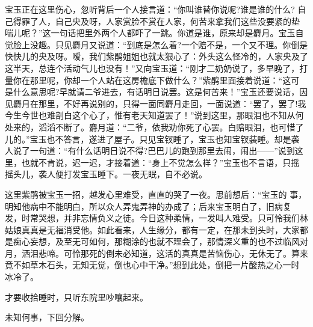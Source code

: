 宝玉正在这里伤心，忽听背后一个人接言道：“你叫谁替你说呢?谁是谁的什么?
自己得罪了人，自己央及呀，人家赏脸不赏在人家，何苦来拿我们这些没要紧的垫
喘儿呢？”这一句话把里外两个人都吓了一跳。你道是谁，原来却是麝月。宝玉自
觉脸上没趣。只见麝月又说道：“到底是怎么着?一个赔不是，一个又不理。你倒是
快快儿的央及呀。嗳，我们紫鹃姐姐也就太狠心了：外头这么怪冷的，人家央及了
这半天，总连个活动气儿也没有！”又向宝玉道：“刚才二奶奶说了，多早晚了，打
量你在那里呢，你却一个人站在这房檐底下做什么？”紫鹃里面接着说道：“这可
是什么意思呢?早就请二爷进去，有话明日说罢。这是何苦来！”宝玉还要说话，因
见麝月在那里，不好再说别的，只得一面同麝月走回，一面说道：“罢了，罢了!我
今生今世也难剖白这个心了，惟有老天知道罢了！”说到这里，那眼泪也不知从何
处来的，滔滔不断了。麝月道：“二爷，依我劝你死了心罢。白赔眼泪，也可惜了
儿的。”宝玉也不答言，遂进了屋子。只见宝钗睡了，宝玉也知宝钗装睡。却是袭
人说了一句道：“有什么话明日说不得?巴巴儿的跑到那里去闹，闹出——”说到这
里，也就不肯说，迟一迟，才接着道：“身上不觉怎么样？”宝玉也不言语，只摇
摇头儿，袭人便打发宝玉睡下。一夜无眠，自不必说。

这里紫鹃被宝玉一招，越发心里难受，直直的哭了一夜。思前想后：“宝玉的
事，明知他病中不能明白，所以众人弄鬼弄神的办成了；后来宝玉明白了，旧病复
发，时常哭想，并非忘情负义之徒。今日这种柔情，一发叫人难受。只可怜我们林
姑娘真真是无福消受他。如此看来，人生缘分，都有一定，在那未到头时，大家都
是痴心妄想，及至无可如何，那糊涂的也就不理会了，那情深义重的也不过临风对
月，洒泪悲啼。可怜那死的倒未必知道，这活的真真是苦恼伤心，无休无了。算来
竟不如草木石头，无知无觉，倒也心中干净。”想到此处，倒把一片酸热之心一时
冰冷了。

才要收拾睡时，只听东院里吵嚷起来。

未知何事，下回分解。